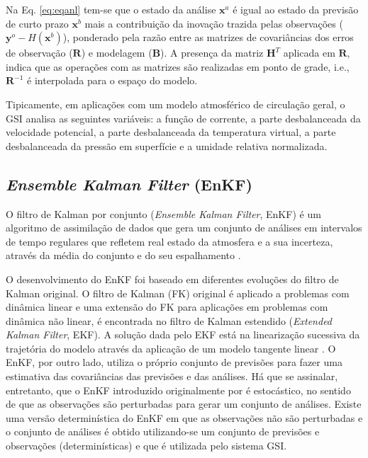Na Eq. \ref{eq:eqanl} tem-se que o estado da análise $\mathbf{x}^{a}$ é igual ao estado da previsão de curto prazo $\mathbf{x}^{b}$ mais a contribuição da inovação trazida pelas observações ($\mathbf{y}^{o} - H(\mathbf{x}^{b})$), ponderado pela razão entre as matrizes de covariâncias dos erros de observação ($\mathbf{R}$) e modelagem ($\mathbf{B}$). A presença da matriz $\mathbf{H}^{T}$ aplicada em $\mathbf{R}$, indica que as operações com as matrizes são realizadas em ponto de grade, i.e., $\mathbf{R}^{-1}$ é interpolada para o espaço do modelo.

Tipicamente, em aplicações com um modelo atmosférico de circulação geral, o GSI analisa as seguintes variáveis: a função de corrente, a parte desbalanceada da velocidade potencial, a parte desbalanceada da temperatura virtual, a parte desbalanceada da pressão em superfície e a umidade relativa normalizada.

\subsection{\textit{Ensemble Kalman Filter} (EnKF)}
\label{sec:enkf}

O filtro de Kalman por conjunto (\textit{Ensemble Kalman Filter}, EnKF) \cite{evensen/2003} é um algoritmo de assimilação de dados que gera um conjunto de análises em intervalos de tempo regulares que refletem real estado da atmosfera e a sua incerteza, através da média do conjunto e do seu espalhamento \cite{harlimehunt/2005}.

O desenvolvimento do EnKF foi baseado em diferentes evoluções do filtro de Kalman original. O filtro de Kalman (FK) original é aplicado a problemas com dinâmica linear e uma extensão do FK para aplicações em problemas com dinâmica não linear, é encontrada no filtro de Kalman estendido (\textit{Extended Kalman Filter}, EKF). A solução dada pelo EKF está na linearização sucessiva da trajetória do modelo através da aplicação de um modelo tangente linear \cite{okaneefrederiksen/2008}. O EnKF, por outro lado, utiliza o próprio conjunto de previsões para fazer uma estimativa das covariâncias das previsões e das análises. Há que se assinalar, entretanto, que o EnKF introduzido originalmente por  é estocástico, no sentido de que as observações são perturbadas para gerar um conjunto de análises. Existe uma versão determinística do EnKF em que as observações não são perturbadas e o conjunto de análises é obtido utilizando-se um conjunto de previsões e observações (determinísticas) e que é utilizada pelo sistema GSI.


